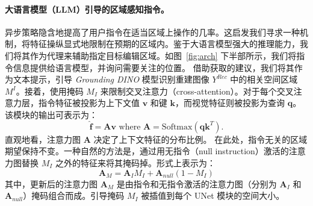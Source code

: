 \paragraph{大语言模型（LLM）引导的区域感知指令。} 异步策略隐含地提高了用户指令在适当区域上操作的几率。这启发我们寻求一种机制，将特征操纵显式地限制在预期的区域内。鉴于大语言模型强大的推理能力，我们将其作为代理来辅助指定目标编辑区域。如图~\ref{fig:arch} 下半部所示，我们将指令信息提供给语言模型，并询问需要关注的位置。
借助获取的建议，我们将其作为文本提示，引导 \emph{Grounding DINO} 模型识别重建图像 $Y^{Rec}$ 中的相关空间区域 $M^I$。接着，使用掩码 $M_I$ 来限制交叉注意力（cross-attention）。对于每个交叉注意力层，指令特征被投影为上下文值 $\textbf{v}$ 和键 $\textbf{k}$，而视觉特征则被投影为查询 $\textbf{q}$。该模块的输出可表示为：
\begin{equation}
    \hat{\textbf{f}} = \textbf{A} \textbf{v} \text{  where  } \textbf{A} = \text{Softmax}(\textbf{q}\textbf{k}^T).
\end{equation}
直观地看，注意力图 $\textbf{A}$ 决定了上下文特征的分布比例。
在此处，指令无关的区域期望保持不变。一种自然的方法是，通过用无指令（null instruction）激活的注意力图替换 $M_I$ 之外的特征来将其掩码掉。形式上表示为：
\begin{equation}
    \textbf{A}_M = \textbf{A}_I M_I + \textbf{A}_{null} (1-M_I)
\end{equation}
其中，更新后的注意力图 $\textbf{A}_M$ 是由指令和无指令激活的注意力图（分别为 $\textbf{A}_I$ 和 $\textbf{A}_{null}$）掩码组合而成。引导掩码 $M_I$ 被插值到每个 UNet 模块的空间大小。